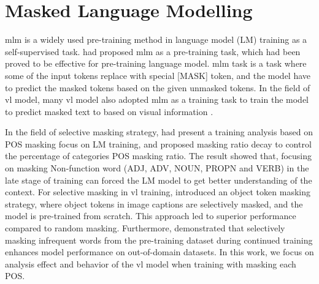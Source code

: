 \section{Masked Language Modelling}
\acrshort{mlm} is a widely used pre-training method in language model (LM) training \cite{bert, albert, dictbert, opt, realm} as a self-supervised task.
 had proposed \acrshort{mlm} as a pre-training task, which had been proved to be effective for pre-training language model.
\acrshort{mlm} task is a task where some of the input tokens replace with special [MASK] token, and the model have to predict the masked tokens based on the given unmasked tokens.
In the field of \acrshort{vl} model, many \acrshort{vl} model also adopted \acrshort{mlm} as a training task to train the model to predict masked text to based on visual information \cite{albef, mplug, uniter, beit-3}.


In the field of selective masking strategy,  had present a training analysis based on POS masking focus on LM training, and proposed masking ratio decay to control the percentage of categories POS masking ratio.
The result showed that, focusing on masking Non-function word (ADJ, ADV, NOUN, PROPN and VERB) in the late stage of training can forced the LM model to get better understanding of the context. 
For selective masking in \acrshort{vl} training,  introduced an object token masking strategy, where object tokens in image captions are selectively masked, and the model is pre-trained from scratch.
This approach led to superior performance compared to random masking.
Furthermore,  demonstrated that selectively masking infrequent words from the pre-training dataset during continued training enhances model performance on out-of-domain datasets.
In this work, we focus on analysis effect and behavior of the \acrshort{vl} model when training with masking each POS.


